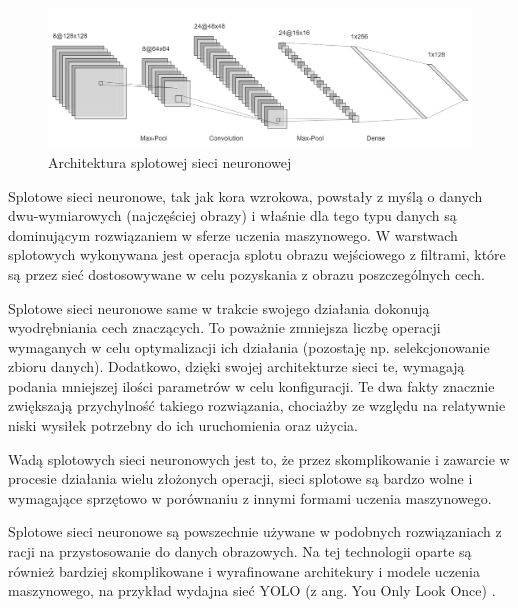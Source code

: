 \begin{figure}[h!]
    \begin{center}
        \includegraphics[scale=0.5]{img/cnn_arch_pic.png}
    \end{center}
    \caption{Architektura splotowej sieci neuronowej\protect\footnotemark}
    \label{fig:cnn_arch_pic}
\end{figure}


Splotowe sieci neuronowe, tak jak kora wzrokowa, powstały z myślą o danych dwu-wymiarowych (najczęściej obrazy) i właśnie dla tego typu danych są dominującym rozwiązaniem w sferze uczenia maszynowego. W warstwach splotowych wykonywana jest operacja splotu obrazu wejściowego z filtrami, które są przez sieć dostosowywane w celu pozyskania z obrazu poszczególnych cech.

Splotowe sieci neuronowe same w trakcie swojego działania dokonują wyodrębniania cech znaczących. To poważnie zmniejsza liczbę operacji wymaganych w celu optymalizacji ich działania (pozostaję np. selekcjonowanie zbioru danych). Dodatkowo, dzięki swojej architekturze sieci te, wymagają podania mniejszej ilości parametrów w celu konfiguracji. Te dwa fakty znacznie zwiększają przychylność takiego rozwiązania, chociażby ze względu na relatywnie niski wysiłek potrzebny do ich uruchomienia oraz użycia.

Wadą splotowych sieci neuronowych jest to, że przez skomplikowanie i zawarcie w procesie działania wielu złożonych operacji, sieci splotowe są bardzo wolne i wymagające sprzętowo w porównaniu z innymi formami uczenia maszynowego.

Splotowe sieci neuronowe są powszechnie używane w podobnych rozwiązaniach z racji na przystosowanie do danych obrazowych. Na tej technologii oparte są również bardziej skomplikowane i wyrafinowane architekury i modele uczenia maszynowego, na przykład wydajna sieć YOLO (z ang. You Only Look Once) \cite{yolov3}.


